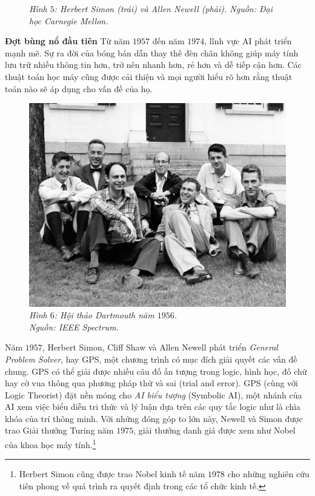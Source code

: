 \begin{multicols}{2}
\begin{figure}[H]
		\caption{\small\textit{\color{timhieukhoahoc}Hình $5$: Herbert Simon (trái) và Allen Newell (phải). Nguồn: Đại học Carnegie Mellon.}}
		\vspace*{-10pt}
	\end{figure}
	\textbf{\color{timhieukhoahoc}Đợt bùng nổ đầu tiên}
	\vskip 0.1cm
	Từ năm $1957$ đến năm $1974$, lĩnh vực AI phát triển mạnh mẽ. Sự ra đời của bóng bán dẫn thay thế đèn chân không giúp máy tính lưu trữ nhiều thông tin hơn, trở nên nhanh hơn, rẻ hơn và dễ tiếp cận hơn. Các thuật toán học máy cũng được cải thiện và mọi người hiểu rõ hơn rằng thuật toán nào sẽ áp dụng cho vấn đề của họ.
	\begin{figure}[H]
		\vspace*{5pt}
		\centering
		\captionsetup{labelformat= empty, justification=centering}
		\includegraphics[width= 1\linewidth]{Dartmouth.jpg}
		\caption{\small\textit{\color{timhieukhoahoc}Hình $6$: Hội thảo Dartmouth năm $1956$.\\ Nguồn: IEEE Spectrum.}}
		\vspace*{-10pt}
	\end{figure}
	Năm $1957$, Herbert Simon, Cliff Shaw và Allen Newell phát triển \textit{General Problem Solver}, hay GPS, một chương trình có mục đích giải quyết các vấn đề chung. GPS có thể giải được nhiều câu đố ấn tượng trong logic, hình học, đố chữ hay cờ vua thông qua phương pháp thử và sai (trial and error). GPS (cùng với Logic Theorist) đặt nền móng cho \textit{AI biểu tượng} (Symbolic AI), một nhánh của AI xem việc biểu diễn tri thức và lý luận dựa trên các quy tắc logic như là chìa khóa của trí thông minh. Với những đóng góp to lớn này, Newell và Simon được trao Giải thưởng Turing năm $1975$, giải thưởng danh giá được xem như Nobel của khoa học máy tính.\footnote{\color{timhieukhoahoc}Herbert Simon cũng được trao Nobel kinh tế năm $1978$ cho những nghiên cứu tiên phong về quá trình ra quyết định trong các tổ chức kinh tế.}

\end{multicols}
